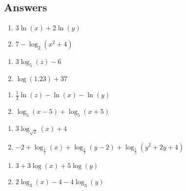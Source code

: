 \newpage

\subsection{Answers}


\begin{multicols}{2}
\begin{enumerate}

\item $3\ln(x) + 2\ln(y)$
\item $7 - \log_{2}(x^{2} + 4)$

\setcounter{HW}{\value{enumi}}
\end{enumerate}
\end{multicols}

\begin{multicols}{2}
\begin{enumerate}
\setcounter{enumi}{\value{HW}}


\item $3\log_{5}(z) - 6$
\item $\log(1.23) + 37$

\setcounter{HW}{\value{enumi}}
\end{enumerate}
\end{multicols}

\begin{multicols}{2}
\begin{enumerate}
\setcounter{enumi}{\value{HW}}

\item $\frac{1}{2}\ln(z) - \ln(x) - \ln(y)$
\item  $\log_{5}(x-5) + \log_{5}(x+5)$

\setcounter{HW}{\value{enumi}}
\end{enumerate}
\end{multicols}

\begin{multicols}{2}
\begin{enumerate}
\setcounter{enumi}{\value{HW}}

\item  $3\log_{\sqrt{2}}(x) + 4$
\item \small$-2 + \log_{\frac{1}{3}}(x) + \log_{\frac{1}{3}}(y - 2) + \log_{\frac{1}{3}}(y^{2} + 2y + 4)$\normalsize

\setcounter{HW}{\value{enumi}}
\end{enumerate}
\end{multicols}

\begin{multicols}{2}
\begin{enumerate}
\setcounter{enumi}{\value{HW}}

\item $3 + 3\log(x) + 5 \log(y)$
\item $2\log_{3}(x) - 4 - 4\log_{3}(y)$

\setcounter{HW}{\value{enumi}}
\end{enumerate}
\end{multicols}

